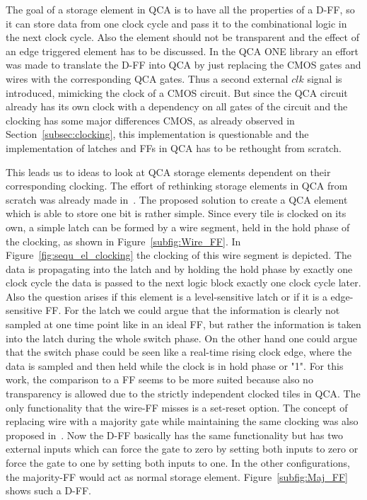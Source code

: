 The goal of a storage element in QCA is to have all the properties of a D-FF, so it can store data from one clock cycle and pass it to the combinational logic in the next clock cycle. Also the element should not be transparent and the effect of an edge triggered element has to be discussed. In the QCA ONE library an effort was made to translate the D-FF into QCA by just replacing the CMOS gates and wires with the corresponding QCA gates. Thus a second external $clk$ signal is introduced, mimicking the clock of a CMOS circuit. But since the QCA circuit already has its own clock with a dependency on all gates of the circuit and the clocking has some major differences CMOS, as already observed in Section~\ref{subsec:clocking}, this implementation is questionable and the implementation of latches and FFs in QCA has to be rethought from scratch.

This leads us to ideas to look at QCA storage elements dependent on their corresponding clocking.
The effort of rethinking storage elements in QCA from scratch was already made in~\cite{torres2018synchronization}. The proposed solution to create a QCA element which is able to store one bit is rather simple. Since every tile is clocked on its own, a simple latch can be formed by a wire segment, held in the hold phase of the clocking, as shown in Figure~\ref{subfig:Wire_FF}. In Figure~\ref{fig:sequ_el_clocking} the clocking of this wire segment is depicted. The data is propagating into the latch and by holding the hold phase by exactly one clock cycle the data is passed to the next logic block exactly one clock cycle later. Also the question arises if this element is a level-sensitive latch or if it is a edge-sensitive FF. For the latch we could argue that the information is clearly not sampled at one time point like in an ideal FF, but rather the information is taken into the latch during the whole switch phase. On the other hand one could argue that the switch phase could be seen like a real-time rising clock edge, where the data is sampled and then held while the clock is in hold phase or "1". For this work, the comparison to a FF seems to be more suited because also no transparency is allowed due to the strictly independent clocked tiles in QCA. The only functionality that the wire-FF misses is a set-reset option. The concept of replacing wire with a majority gate while maintaining the same clocking was also proposed in~\cite{Walter}. Now the D-FF basically has the same functionality but has two external inputs which can force the gate to zero by setting both inputs to zero or force the gate to one by setting both inputs to one. In the other configurations, the majority-FF would act as normal storage element. Figure~\ref{subfig:Maj_FF} shows such a D-FF.

